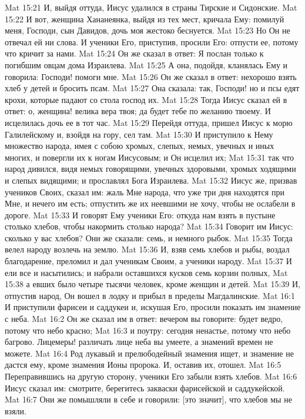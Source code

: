 Mat 15:21  И, выйдя оттуда, Иисус удалился в страны Тирские и Сидонские.
Mat 15:22  И вот, женщина Хананеянка, выйдя из тех мест, кричала Ему: помилуй меня, Господи, сын Давидов, дочь моя жестоко беснуется.
Mat 15:23  Но Он не отвечал ей ни слова. И ученики Его, приступив, просили Его: отпусти ее, потому что кричит за нами.
Mat 15:24  Он же сказал в ответ: Я послан только к погибшим овцам дома Израилева.
Mat 15:25  А она, подойдя, кланялась Ему и говорила: Господи! помоги мне.
Mat 15:26  Он же сказал в ответ: нехорошо взять хлеб у детей и бросить псам.
Mat 15:27  Она сказала: так, Господи! но и псы едят крохи, которые падают со стола господ их.
Mat 15:28  Тогда Иисус сказал ей в ответ: о, женщина! велика вера твоя; да будет тебе по желанию твоему. И исцелилась дочь ее в тот час.
Mat 15:29  Перейдя оттуда, пришел Иисус к морю Галилейскому и, взойдя на гору, сел там.
Mat 15:30  И приступило к Нему множество народа, имея с собою хромых, слепых, немых, увечных и иных многих, и повергли их к ногам Иисусовым; и Он исцелил их;
Mat 15:31  так что народ дивился, видя немых говорящими, увечных здоровыми, хромых ходящими и слепых видящими; и прославлял Бога Израилева.
Mat 15:32  Иисус же, призвав учеников Своих, сказал им: жаль Мне народа, что уже три дня находятся при Мне, и нечего им есть; отпустить же их неевшими не хочу, чтобы не ослабели в дороге.
Mat 15:33  И говорят Ему ученики Его: откуда нам взять в пустыне столько хлебов, чтобы накормить столько народа?
Mat 15:34  Говорит им Иисус: сколько у вас хлебов? Они же сказали: семь, и немного рыбок.
Mat 15:35  Тогда велел народу возлечь на землю.
Mat 15:36  И, взяв семь хлебов и рыбы, воздал благодарение, преломил и дал ученикам Своим, а ученики народу.
Mat 15:37  И ели все и насытились; и набрали оставшихся кусков семь корзин полных,
Mat 15:38  а евших было четыре тысячи человек, кроме женщин и детей.
Mat 15:39  И, отпустив народ, Он вошел в лодку и прибыл в пределы Магдалинские.
Mat 16:1  И приступили фарисеи и саддукеи и, искушая Его, просили показать им знамение с неба.
Mat 16:2  Он же сказал им в ответ: вечером вы говорите: будет ведро, потому что небо красно;
Mat 16:3  и поутру: сегодня ненастье, потому что небо багрово. Лицемеры! различать лице неба вы умеете, а знамений времен не можете.
Mat 16:4  Род лукавый и прелюбодейный знамения ищет, и знамение не дастся ему, кроме знамения Ионы пророка. И, оставив их, отошел.
Mat 16:5  Переправившись на другую сторону, ученики Его забыли взять хлебов.
Mat 16:6  Иисус сказал им: смотрите, берегитесь закваски фарисейской и саддукейской.
Mat 16:7  Они же помышляли в себе и говорили: [это значит], что хлебов мы не взяли.
